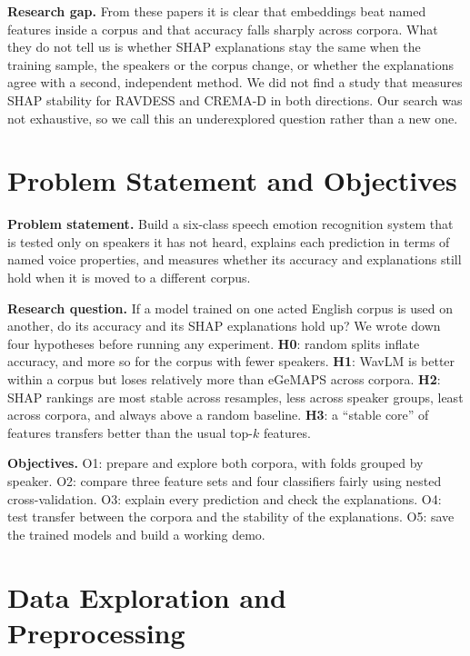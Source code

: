 \documentclass[conference]{IEEEtran}
\begin{document}
\textbf{Research gap.} From these papers it is clear that embeddings beat named features inside a corpus and that accuracy falls sharply across corpora. What they do not tell us is whether SHAP explanations stay the same when the training sample, the speakers or the corpus change, or whether the explanations agree with a second, independent method. We did not find a study that measures SHAP stability for RAVDESS and CREMA-D in both directions. Our search was not exhaustive, so we call this an underexplored question rather than a new one.

\section{Problem Statement and Objectives}
\textbf{Problem statement.} Build a six-class speech emotion recognition system that is tested only on speakers it has not heard, explains each prediction in terms of named voice properties, and measures whether its accuracy and explanations still hold when it is moved to a different corpus.

\textbf{Research question.} If a model trained on one acted English corpus is used on another, do its accuracy and its SHAP explanations hold up? We wrote down four hypotheses before running any experiment. \textbf{H0}: random splits inflate accuracy, and more so for the corpus with fewer speakers. \textbf{H1}: WavLM is better within a corpus but loses relatively more than eGeMAPS across corpora. \textbf{H2}: SHAP rankings are most stable across resamples, less across speaker groups, least across corpora, and always above a random baseline. \textbf{H3}: a ``stable core'' of features transfers better than the usual top-$k$ features.

\textbf{Objectives.} O1: prepare and explore both corpora, with folds grouped by speaker. O2: compare three feature sets and four classifiers fairly using nested cross-validation. O3: explain every prediction and check the explanations. O4: test transfer between the corpora and the stability of the explanations. O5: save the trained models and build a working demo.

\section{Data Exploration and Preprocessing}
\end{document}
